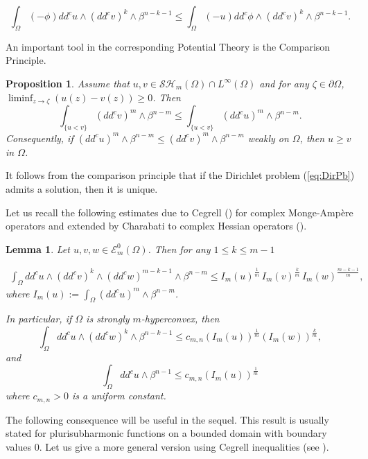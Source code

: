 \documentclass[12pt]{amsart}
\newtheorem{lemma}[theorem]{Lemma}
\newtheorem{proposition}[theorem]{Proposition}
\theoremstyle{definition}
\numberwithin{theorem}{section}
\numberwithin{equation}{section}
\begin{document}
\begin{equation} \label{eq:testinequality}
\int_\Omega (-\phi)  dd^c u \wedge (dd^c v)^k \wedge \beta^{n - k-1} \leq \int_\Omega (-u)  dd^c \phi \wedge (dd^c v)^k \wedge \beta^{n - k-1}. 
\end{equation}


An important tool in the corresponding Potential Theory is the Comparison Principle.

\begin{proposition} \label{prop:Comparison Principle}
 Assume that $u,v\in \mathcal{SH}_m(\Omega)\cap L^{\infty}(\Omega)$ and for any $\zeta \in \partial \Omega$, $\liminf_{z \rightarrow \zeta }(u(z)- v(z))\geq 0$.  Then 
 $$
 \int_{\{u<v\}}(dd^c v)^m\wedge\beta^{n-m} \leq \int_{\{u<v\}}(dd^c u)^m\wedge\beta^{n-m}.
 $$
 Consequently, if $(dd^cu)^m\wedge\beta^{n-m}\leq(dd^cv)^m\wedge\beta^{n-m}$ weakly on $\Omega$, then $u \geq v$ in $\Omega$.
 
\end{proposition}
It follows from the comparison principle that if the Dirichlet problem (\ref{eq:DirPb}) admits a solution, then it is unique.



Let us recall the following estimates due to Cegrell (\cite{Ceg04}) for complex Monge-Amp\`ere operators and extended by Charabati to  complex Hessian operators (\cite{Ch16a}).


\begin{lemma} \label{lem:Cegrell} Let  $u, v, w \in\mathcal{E}_m^0(\Omega)$. Then for any $1 \leq k \leq m - 1$
   
 $$
    \begin{array}{lcl}
 \int_{\Omega}dd^cu\wedge(dd^cv)^k\wedge(dd^cw)^{m-k-1}\wedge\beta^{n-m}
     \leq  I_m (u)^{\frac{1}{m}} \, I_m (v)^{\frac{k}{m}} \,  I_m (w)^{\frac{m-k-1}{m}},
  \end{array}
 $$
 where $I_m (u) :=  \int_{\Omega}(dd^c u)^m \wedge \beta^{n-m}$.
 
 In particular, if $\Omega$ is strongly $m$-hyperconvex, then
 $$
 \int_{\Omega}dd^c u \wedge (dd^c w)^k \wedge\beta^{n-k -1}  \leq  c_{m,n} \left(I_m (u)\right)^{\frac{1}{m}} \left(I_m (w)\right)^{\frac{k}{m}},
 $$
 and 
$$ 
  \int_{\Omega}dd^c u  \wedge \beta^{n-1}  \leq  c_{m,n} \left(I_m (u)\right)^{\frac{1}{m}}
 $$
 where $c_{m,n} > 0$ is a uniform constant.
\end{lemma}


The following consequence will be useful in the sequel. This result is usually stated for plurisubharmonic functions on a bounded domain  with boundary values $0$. Let us give a more general version using Cegrell inequalities (see \cite{BZ20}).
\end{document}
